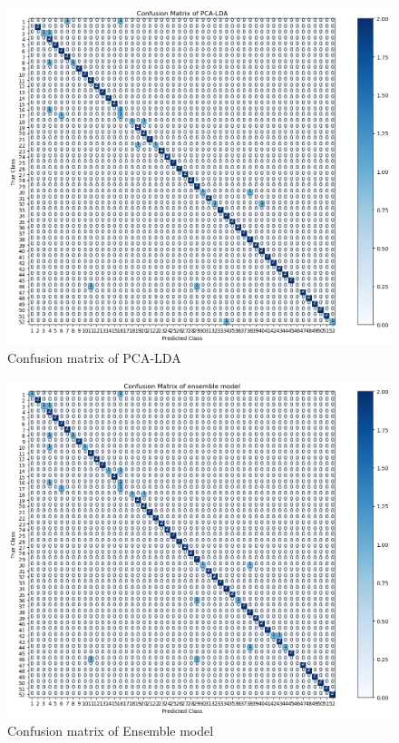 \begin{figure}[H]
  \centering
   \includegraphics[width=0.8\linewidth]{image/q3_1_cm.png} %

   \caption{Confusion matrix of PCA-LDA}
   \label{fig:q3_1_cm}
\end{figure}

\begin{figure}[H]
  \centering
   \includegraphics[width=0.8\linewidth]{image/q3_2_cm.png} %

   \caption{Confusion matrix of Ensemble model}
   \label{fig:q3_2_cm}
\end{figure}


